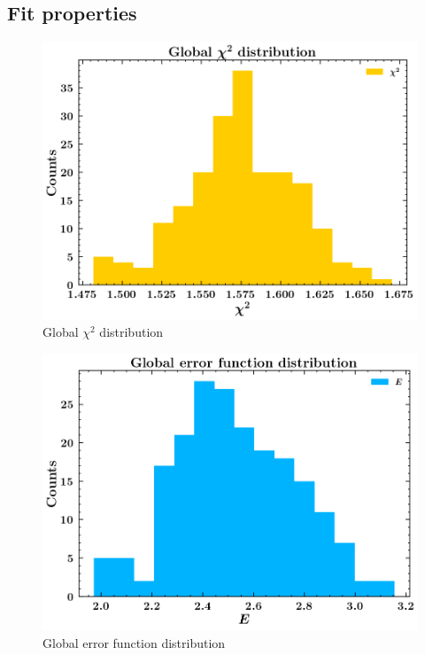 \documentclass[]{article}
\begin{document}
\hypertarget{fit-properties}{%
\subsection{Fit properties}\label{fit-properties}}

\begin{figure}
\centering
\includegraphics{pngplots/Globalchi2.png}
\caption{Global \(\chi^2\) distribution}
\end{figure}

\begin{figure}
\centering
\includegraphics{pngplots/GlobalErrorFunction.png}
\caption{Global error function distribution}
\end{figure}
\end{document}
